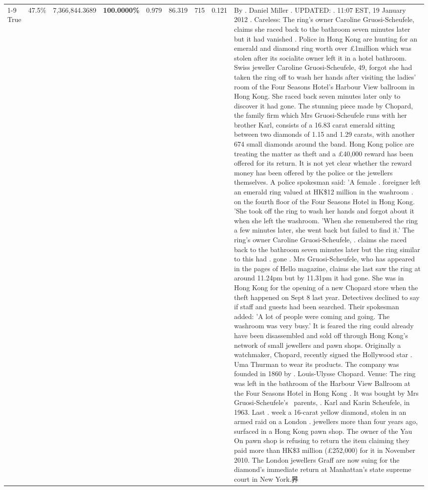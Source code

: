 \begin{table}[H]
\begin{tabular}{lllrlllll}
\cline{1-9} \cline{2-9}
True & 47.5\% & 7,366,844.3689 & \bfseries \color{red} 100.0000\% & 0.979 & 86.319 & 715 & 0.121 & By . Daniel Miller . UPDATED: . 11:07 EST, 19 January 2012 . Careless: The ring's owner Caroline Gruosi-Scheufele, claims she raced back to the bathroom seven minutes later but it had vanished . Police in Hong Kong are hunting for an emerald and diamond ring worth over £1million which was stolen after its socialite owner left it in a hotel bathroom. Swiss jeweller Caroline Gruosi-Scheufele, 49, forgot she had taken the ring off to wash her hands after visiting the ladies' room of the Four Seasons Hotel's Harbour View ballroom in Hong Kong. She raced back seven minutes later only to discover it had gone. The stunning piece made by Chopard, the family firm which Mrs Gruosi-Scheufele runs with her brother Karl, consists of a 16.83 carat emerald sitting between two diamonds of 1.15 and 1.29 carats, with another 674 small diamonds around the band. Hong Kong police are treating the matter as theft and a £40,000 reward has been offered for its return. It is not yet clear whether the reward money has been offered by the police or the jewellers themselves. A police spokesman said: 'A female . foreigner left an emerald ring valued at HK\$12 million in the washroom . on the fourth floor of the Four Seasons Hotel in Hong Kong. 'She took off the ring to wash her hands and forgot about it when she left the washroom. 'When she remembered the ring a few minutes later, she went back but failed to find it.' The ring's owner Caroline Gruosi-Scheufele, . claims she raced back to the bathroom seven minutes later but the ring similar to this had . gone . Mrs Gruosi-Scheufele, who has appeared in the pages of Hello magazine, claims she last saw the ring at around 11.24pm but by 11.31pm it had gone. She was in Hong Kong for the opening of a new Chopard store when the theft happened on Sept 8 last year. Detectives declined to say if staff and guests had been searched. Their spokesman added: 'A lot of people were coming and going. The washroom was very busy.' It is feared the ring could already have been disassembled and sold off through Hong Kong's network of small jewellers and pawn shops. Originally a watchmaker, Chopard, recently signed the Hollywood star . Uma Thurman to wear its products. The company was founded in 1860 by . Louis-Ulysse Chopard. Venue: The ring was left in the bathroom of the Harbour View Ballroom at the Four Seasons Hotel in Hong Kong . It was bought by Mrs Gruosi-Scheufele's  parents, . Karl and Karin Scheufele, in 1963. Last . week a 16-carat yellow diamond, stolen in an armed raid on a London . jewellers more than four years ago, surfaced in a Hong Kong pawn shop. The owner of the Yau On pawn shop is refusing to return the item claiming they paid more than HK\$3 million (£252,000) for it in November 2010. The London jewellers Graff are now suing for the diamond’s immediate return at Manhattan’s state supreme court in New York.昦 \\

\end{tabular}
\end{table}
